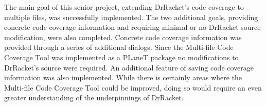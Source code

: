 The main goal of this senior project, extending DrRacket's code coverage to multiple files, was successfully implemented. The two additional goals, providing concrete code coverage information and requiring minimal or no DrRacket source modification, were also completed. Concrete code coverage information was provided through a series of additional dialogs. Since the Multi-file Code Coverage Tool was implemented as a PLaneT package no modifications to DrRacket's source were required. An additional feature of saving code coverage information was also implemented. While there is certainly areas where the Multi-file Code Coverage Tool could be improved, doing so would require an even greater understanding of the underpinnings of DrRacket. 
